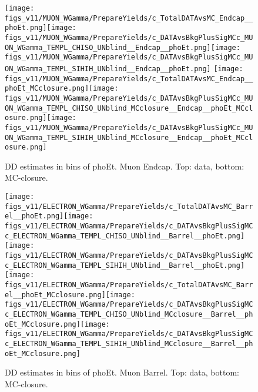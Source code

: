 \begin{figure}[htb]
  \begin{center}
   \texttt{[image: figs\_v11/MUON\_WGamma/PrepareYields/c\_TotalDATAvsMC\_Endcap\_\_phoEt.png]}\texttt{[image: figs\_v11/MUON\_WGamma/PrepareYields/c\_DATAvsBkgPlusSigMCc\_MUON\_WGamma\_TEMPL\_CHISO\_UNblind\_\_Endcap\_\_phoEt.png]}\texttt{[image: figs\_v11/MUON\_WGamma/PrepareYields/c\_DATAvsBkgPlusSigMCc\_MUON\_WGamma\_TEMPL\_SIHIH\_UNblind\_\_Endcap\_\_phoEt.png]}
   \texttt{[image: figs\_v11/MUON\_WGamma/PrepareYields/c\_TotalDATAvsMC\_Endcap\_\_phoEt\_MCclosure.png]}\texttt{[image: figs\_v11/MUON\_WGamma/PrepareYields/c\_DATAvsBkgPlusSigMCc\_MUON\_WGamma\_TEMPL\_CHISO\_UNblind\_MCclosure\_\_Endcap\_\_phoEt\_MCclosure.png]}\texttt{[image: figs\_v11/MUON\_WGamma/PrepareYields/c\_DATAvsBkgPlusSigMCc\_MUON\_WGamma\_TEMPL\_SIHIH\_UNblind\_MCclosure\_\_Endcap\_\_phoEt\_MCclosure.png]}
  \caption{DD estimates in bins of phoEt. Muon Endcap. Top: data, bottom: MC-closure.}
  \end{center}
\end{figure}

\begin{figure}[htb]
  \begin{center}
   \texttt{[image: figs\_v11/ELECTRON\_WGamma/PrepareYields/c\_TotalDATAvsMC\_Barrel\_\_phoEt.png]}\texttt{[image: figs\_v11/ELECTRON\_WGamma/PrepareYields/c\_DATAvsBkgPlusSigMCc\_ELECTRON\_WGamma\_TEMPL\_CHISO\_UNblind\_\_Barrel\_\_phoEt.png]}\texttt{[image: figs\_v11/ELECTRON\_WGamma/PrepareYields/c\_DATAvsBkgPlusSigMCc\_ELECTRON\_WGamma\_TEMPL\_SIHIH\_UNblind\_\_Barrel\_\_phoEt.png]}
   \texttt{[image: figs\_v11/ELECTRON\_WGamma/PrepareYields/c\_TotalDATAvsMC\_Barrel\_\_phoEt\_MCclosure.png]}\texttt{[image: figs\_v11/ELECTRON\_WGamma/PrepareYields/c\_DATAvsBkgPlusSigMCc\_ELECTRON\_WGamma\_TEMPL\_CHISO\_UNblind\_MCclosure\_\_Barrel\_\_phoEt\_MCclosure.png]}\texttt{[image: figs\_v11/ELECTRON\_WGamma/PrepareYields/c\_DATAvsBkgPlusSigMCc\_ELECTRON\_WGamma\_TEMPL\_SIHIH\_UNblind\_MCclosure\_\_Barrel\_\_phoEt\_MCclosure.png]}
  \caption{DD estimates in bins of phoEt. Muon Barrel. Top: data, bottom: MC-closure. }
  \end{center}
\end{figure}


